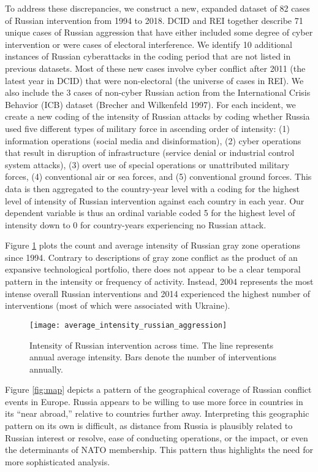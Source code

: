 \documentclass[
]{article}
\begin{document}
To address these discrepancies, we construct a new, expanded dataset of 82 cases of Russian intervention from 1994 to 2018. DCID and REI together describe 71 unique cases of Russian aggression that have either included some degree of cyber intervention or were cases of electoral interference. We identify 10 additional instances of Russian cyberattacks in the coding period that are not listed in previous datasets. Most of these new cases involve cyber conflict after 2011 (the latest year in DCID) that were non-electoral (the universe of cases in REI). We also include the 3 cases of non-cyber Russian action from the International Crisis Behavior (ICB) dataset (Brecher and Wilkenfeld 1997). For each incident, we create a new coding of the intensity of Russian attacks by coding whether Russia used five different types of military force in ascending order of intensity: (1) information operations (social media and disinformation), (2) cyber operations that result in disruption of infrastructure (service denial or industrial control system attacks), (3) overt use of special operations or unattributed military forces, (4) conventional air or sea forces, and (5) conventional ground forces. This data is then aggregated to the country-year level with a coding for the highest level of intensity of Russian intervention against each country in each year. Our dependent variable is thus an ordinal variable coded 5 for the highest level of intensity down to 0 for country-years experiencing no Russian attack.

Figure \ref{fig:intensity} plots the count and average intensity of Russian gray zone operations since 1994. Contrary to descriptions of gray zone conflict as the product of an expansive technological portfolio, there does not appear to be a clear temporal pattern in the intensity or frequency of activity. Instead, 2004 represents the most intense overall Russian interventions and 2014 experienced the highest number of interventions (most of which were associated with Ukraine).

\begin{figure}[h!]
\texttt{[image: average\_intensity\_russian\_aggression]} \caption{Intensity of Russian intervention across time. The line represents annual average intensity. Bars denote the number of interventions annually.}\label{fig:intensity}
\end{figure}

Figure \ref{fig:map} depicts a pattern of the geographical coverage of Russian conflict events in Europe. Russia appears to be willing to use more force in countries in its ``near abroad,'' relative to countries further away. Interpreting this geographic pattern on its own is difficult, as distance from Russia is plausibly related to Russian interest or resolve, ease of conducting operations, or the impact, or even the determinants of NATO membership. This pattern thus highlights the need for more sophisticated analysis.
\end{document}
